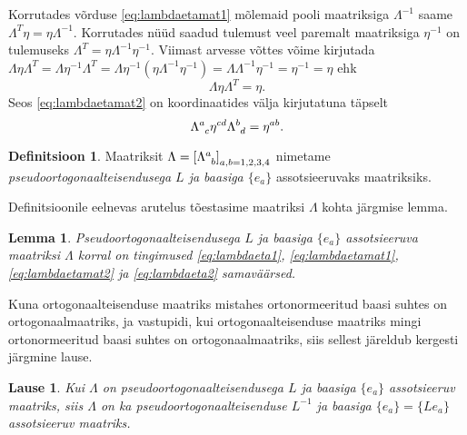 \documentclass[a4paper,12pt]{article}
\theoremstyle{plain}
\newtheorem{lemma}{Lemma}[section]
\newtheorem{lause}{Lause}[section]
\theoremstyle{definition}
\newtheorem{definitsioon}{Definitsioon}[section]
\numberwithin{equation}{section}
\begin{document}
Korrutades võrduse \ref{eq:lambdaetamat1} mõlemaid pooli maatriksiga $\Lambda^{-1}$ saame $\Lambda^T \eta = \eta \Lambda^{-1}$. Korrutades nüüd saadud tulemust veel paremalt maatriksiga $\eta^{-1}$ on tulemuseks $\Lambda^T = \eta \Lambda^{-1} \eta^{-1}$. Viimast arvesse võttes võime kirjutada $\Lambda \eta \Lambda^T = \Lambda \eta^{-1} \Lambda^T = \Lambda \eta^{-1} \left( \eta \Lambda^{-1} \eta^{-1} \right) = \Lambda \Lambda^{-1} \eta^{-1} = \eta^{-1} = \eta$ ehk
\begin{equation} \label{eq:lambdaetamat2}
\Lambda \eta \Lambda^T = \eta.
\end{equation}
Seos \ref{eq:lambdaetamat2} on koordinaatides välja kirjutatuna täpselt
\begin{equation} \label{eq:lambdaeta2}
\Lambda\indices{^a_c} \eta^{cd} \Lambda\indices{^b_d} = \eta^{ab}.
\end{equation}
\begin{definitsioon}
Maatriksit $\Lambda = \left[\Lambda\indices{^a_b} \right]_{a,b=1,2,3,4}$ nimetame \emph{pseudoortogonaalteisendusega $L$ ja baasiga $\{e_a\}$} assotsieeruvaks maatriksiks.
\end{definitsioon}
Definitsioonile eelnevas arutelus tõestasime maatriksi $\Lambda$ kohta järgmise lemma.
\begin{lemma} \label{lemma:lambdainvariant}
Pseudoortogonaalteisendusega $L$ ja baasiga $\{e_a\}$ assotsieeruva maatriksi $\Lambda$ korral on tingimused \ref{eq:lambdaeta1}, \ref{eq:lambdaetamat1}, \ref{eq:lambdaetamat2} ja \ref{eq:lambdaeta2} samaväärsed.
\end{lemma}

Kuna ortogonaalteisenduse maatriks mistahes ortonormeeritud baasi suhtes on ortogonaalmaatriks, ja vastupidi, kui ortogonaalteisenduse maatriks mingi ortonormeeritud baasi suhtes on ortogonaalmaatriks, siis sellest järeldub kergesti järgmine lause.

\begin{lause}\textnormal{\cite[lk 271]{Kilp}}
Kui $\Lambda$ on pseudoortogonaalteisendusega $L$ ja baasiga $\{e_a\}$ assotsieeruv maatriks, siis $\Lambda$ on ka pseudoortogonaalteisenduse $L^{-1}$ ja baasiga $\{\hat{e}_a\} = \{Le_a\}$ assotsieeruv maatriks.
\end{lause}
\end{document}
